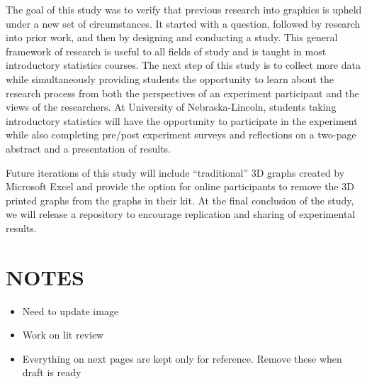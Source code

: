 \documentclass[letterpaper,inpress,dvipsnames]{jdsart}
\begin{document}
The goal of this study was to verify that previous research into graphics is upheld under a new set of circumstances. It started with a question, followed by research into prior work, and then by designing and conducting a study. This general framework of research is useful to all fields of study and is taught in most introductory statistics courses. The next step of this study is to collect more data while simultaneously providing students the opportunity to learn about the research process from both the perspectives of an experiment participant and the views of the researchers. At University of Nebraska-Lincoln, students taking introductory statistics will have the opportunity to participate in the experiment while also completing pre/post experiment surveys and reflections on a two-page abstract and a presentation of results.

Future iterations of this study will include ``traditional'' 3D graphs created by Microsoft Excel and provide the option for online participants to remove the 3D printed graphs from the graphs in their kit. At the final conclusion of the study, we will release a repository to encourage replication and sharing of experimental results.

\newpage

\hypertarget{notes}{%
\section{NOTES}\label{notes}}

\begin{itemize}
\item
  Need to update image
\item
  Work on lit review
\item
  Everything on next pages are kept only for reference. Remove these when draft is ready
\end{itemize}



\end{document}
